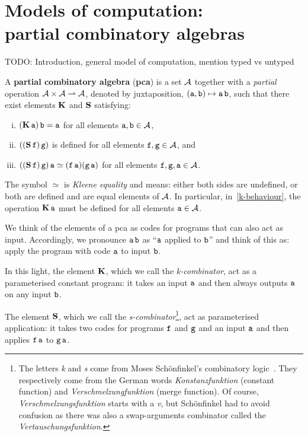 \chapter[Models of computation: partial combinatory algebras]{Models of computation: \\ partial combinatory algebras}\label{chap:PCA}

\textcolor{Mulberry}{TODO: Introduction, general model of computation, mention
  typed vs untyped}

\begin{definition}\label{def:pca}
  A \textbf{partial combinatory algebra} (\textbf{pca}) is a set \(\AA\) together with a \emph{partial}
  operation \(\AA \times \AA \pto \AA\), denoted by juxtaposition,
  \((\pca{a},\pca{b}) \mapsto \pca{a}\pca{b}\), such that there exist elements \(\kcomb\) and \(\scomb\)
  satisfying:
  \begin{enumerate}[(i)]
  \item\label{k-behaviour} \((\kcomb \pca{a}) \pca{b} = \pca{a}\) for all elements
    \(\pca{a},\pca{b} \in \AA\),
  \item\label{s-defined} \(((\scomb \pca{f}) \pca{g})\) is defined for all elements
    \(\pca{f},\pca{g} \in \AA\), and
  \item\label{s-behaviour}
    \(((\scomb \pca{f}) \pca{g}) \pca{a} \simeq
    (\pca{f}\pca{a})(\pca{g}\pca{a})\) for all elements
    \(\pca{f},\pca{g},\pca{a} \in \AA\).
  \end{enumerate}
  The symbol \(\simeq\) is \emph{Kleene equality} and means: either both sides
  are undefined, or both are defined and are equal elements of \(\AA\).
  In particular, in~\ref{k-behaviour}, the operation \(\kcomb\pca{a}\) must be
  defined for all elements \(\pca{a} \in \AA\).
\end{definition}

We think of the elements of a pca as codes for programs that can also act as
input. Accordingly, we pronounce \(\pca{a}\pca{b}\) as ``\(\pca{a}\) applied to
\(\pca{b}\)'' and think of this as: apply the program with code \(\pca{a}\) to
input \(\pca{b}\).

In this light, the element \(\kcomb\), which we call the \emph{k-combinator}, act
as a parameterised constant program: it takes an input \(\pca{a}\) and then
always outputs \(\pca{a}\) on any input \(\pca{b}\).

The element \(\scomb\), which we call the \emph{s-combinator}\footnote{The
  letters \emph{k} and \emph{s} come from Moses Sch\"onfinkel's combinatory
  logic~\cite{Schonfinkel1924}. They respectively come from the German words
  \emph{Konstanzfunktion} (constant function) and \emph{Verschmelzungfunktion}
  (merge function). Of course, \emph{Verschmelzungsfunktion} starts with a
  \emph{v}, but Sch\"onfinkel had to avoid confusion as there was also a
  swap-arguments combinator called the \emph{Vertauschungsfunktion}.}, act as
parameterised application: it takes two codes for programs \(\pca{f}\) and
\(\pca{g}\) and an input \(\pca{a}\) and then applies \(\pca{f}\pca{a}\) to
\(\pca{g}\pca{a}\).

